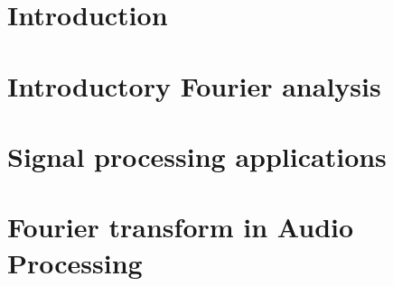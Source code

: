 \documentclass{article}
\begin{document}

\renewcommand{\cftsecfont}{\fontfamily{comfortaa}\selectfont}

\renewcommand{\cftsubsecfont}{\fontfamily{comfortaa}\selectfont}
\renewcommand{\cftsubsubsecfont}{\fontfamily{comfortaa}\selectfont}
\renewcommand{\contentsname}{\fontfamily{comfortaa}\selectfont Table of Contents}



\tableofcontents    

\section{Introduction}
 

\section{Introductory Fourier analysis}
 

\section{Signal processing applications}
 


\section{Fourier transform in Audio Processing}
 








\end{document}
